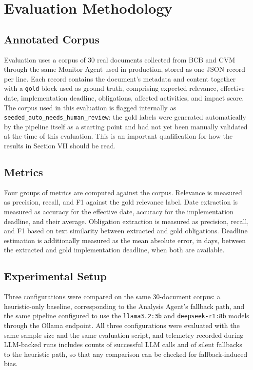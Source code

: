 \documentclass[conference]{IEEEtran}
\begin{document}
\section{Evaluation Methodology}

\subsection{Annotated Corpus}

Evaluation uses a corpus of 30 real documents collected from BCB and CVM through the same Monitor Agent used in production, stored as one JSON record per line. Each record contains the document's metadata and content together with a \texttt{gold} block used as ground truth, comprising expected relevance, effective date, implementation deadline, obligations, affected activities, and impact score. The corpus used in this evaluation is flagged internally as \texttt{seeded\_auto\_needs\_human\_review}: the gold labels were generated automatically by the pipeline itself as a starting point and had not yet been manually validated at the time of this evaluation. This is an important qualification for how the results in Section VII should be read.

\subsection{Metrics}

Four groups of metrics are computed against the corpus. Relevance is measured as precision, recall, and F1 against the gold relevance label. Date extraction is measured as accuracy for the effective date, accuracy for the implementation deadline, and their average. Obligation extraction is measured as precision, recall, and F1 based on text similarity between extracted and gold obligations. Deadline estimation is additionally measured as the mean absolute error, in days, between the extracted and gold implementation deadline, when both are available.

\subsection{Experimental Setup}

Three configurations were compared on the same 30-document corpus: a heuristic-only baseline, corresponding to the Analysis Agent's fallback path, and the same pipeline configured to use the \texttt{llama3.2:3b} and \texttt{deepseek-r1:8b} models through the Ollama endpoint. All three configurations were evaluated with the same sample size and the same evaluation script, and telemetry recorded during LLM-backed runs includes counts of successful LLM calls and of silent fallbacks to the heuristic path, so that any comparison can be checked for fallback-induced bias.
\end{document}
